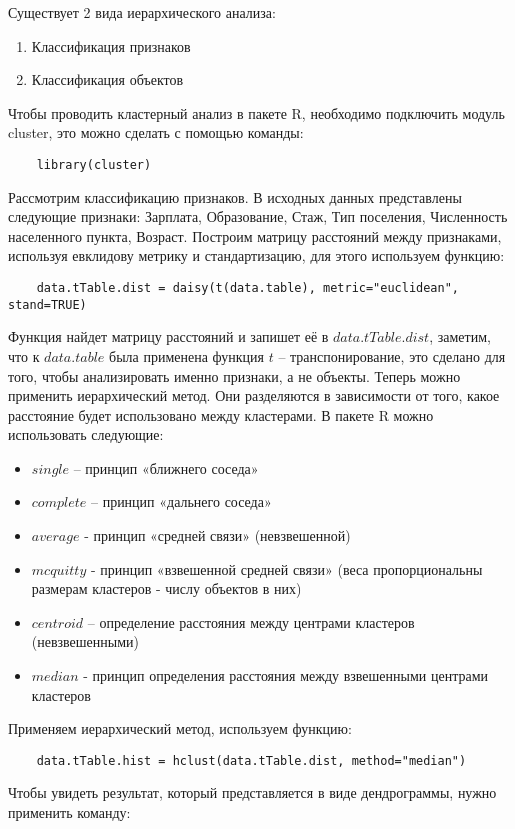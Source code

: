 \documentclass[12pt,a4paper,titlepage]{article}
\begin{document}
  \par
  Существует 2 вида иерархического анализа:
  \begin{enumerate}
    \item Классификация признаков
    \item Классификация объектов
  \end{enumerate}

  Чтобы проводить кластерный анализ в пакете R, необходимо подключить модуль cluster, это можно сделать с помощью команды:

  \begin{lstlisting}
    library(cluster)
  \end{lstlisting}

  Рассмотрим классификацию признаков.
  В исходных данных представлены следующие признаки: Зарплата, Образование, Стаж, Тип поселения, Численность населенного пункта, Возраст.
  Построим матрицу расстояний между признаками, используя евклидову метрику и стандартизацию, для этого используем функцию:
  \begin{lstlisting}
    data.tTable.dist = daisy(t(data.table), metric="euclidean", stand=TRUE)
  \end{lstlisting}
  Функция найдет матрицу расстояний и запишет её в $data.tTable.dist$, заметим, что к $data.table$ была применена функция $t$ – транспонирование, это сделано для того, чтобы анализировать именно признаки, а не объекты.
  Теперь можно применить иерархический метод.
  Они разделяются в зависимости от того, какое расстояние будет использовано между кластерами.
  В пакете R можно использовать следующие:

  \begin{itemize}
    \item $single$ – принцип «ближнего соседа»
    \item $complete$ – принцип «дальнего соседа»
    \item $average$ - принцип «средней связи» (невзвешенной)
    \item $mcquitty$ - принцип «взвешенной средней связи» (веса пропорциональны размерам кластеров - числу объектов в них)
    \item $centroid$ – определение расстояния между центрами кластеров (невзвешенными)
    \item $median$ - принцип определения расстояния между взвешенными центрами кластеров
  \end{itemize}
  Применяем иерархический метод, используем функцию:
  \begin{lstlisting}
    data.tTable.hist = hclust(data.tTable.dist, method="median")
  \end{lstlisting}
  Чтобы увидеть результат, который представляется в виде дендрограммы, нужно применить команду:
\end{document}
